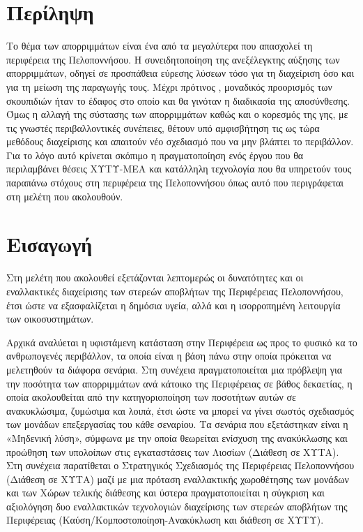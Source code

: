 \documentclass[12pt]{article}
\begin{document}
	\section*{Περίληψη}
	Το θέμα των απορριμμάτων είναι ένα από τα μεγαλύτερα που απασχολεί τη περιφέρεια της Πελοποννήσου. Η συνειδητοποίηση της ανεξέλεγκτης αύξησης των απορριμμάτων, οδηγεί σε προσπάθεια εύρεσης λύσεων τόσο για τη διαχείριση όσο και για τη μείωση της παραγωγής τους. Μέχρι πρότινος , μοναδικός προορισμός των σκουπιδιών ήταν το έδαφος στο οποίο και θα γινόταν η διαδικασία της αποσύνθεσης. Όμως η αλλαγή της σύστασης των απορριμμάτων καθώς και ο κορεσμός της γης, με τις γνωστές περιβαλλοντικές συνέπειες, θέτουν υπό αμφισβήτηση τις ως τώρα μεθόδους διαχείρισης και απαιτούν νέο σχεδιασμό που να μην βλάπτει το περιβάλλον. Για το λόγο αυτό κρίνεται σκόπιμο η πραγματοποίηση ενός έργου που θα περιλαμβάνει θέσεις ΧΥΤΥ-ΜΕΑ και κατάλληλη τεχνολογία που θα υπηρετούν τους παραπάνω στόχους στη περιφέρεια της Πελοποννήσου όπως αυτό που περιγράφεται στη μελέτη που ακολουθούν.
	\newpage
	
	\tableofcontents
	\newpage
	\listoffigures
	\newpage
	\listoftables
	\newpage
	
	
	\section{Εισαγωγή}
	Στη μελέτη που ακολουθεί εξετάζονται λεπτομερώς οι δυνατότητες και οι εναλλακτικές διαχείρισης των στερεών αποβλήτων της Περιφέρειας Πελοποννήσου, έτσι ώστε να εξασφαλίζεται η δημόσια υγεία, αλλά και η ισορροπημένη λειτουργία των οικοσυστημάτων. 
	
	Αρχικά αναλύεται η υφιστάμενη κατάσταση στην Περιφέρεια ως προς το φυσικό κα το ανθρωπογενές περιβάλλον, τα οποία είναι η βάση πάνω στην οποία πρόκειται να μελετηθούν τα διάφορα σενάρια. Στη συνέχεια πραγματοποιείται μια πρόβλεψη για την ποσότητα των απορριμμάτων ανά κάτοικο της Περιφέρειας σε βάθος δεκαετίας, η οποία ακολουθείται από την κατηγοριοποίηση των ποσοτήτων αυτών σε ανακυκλώσιμα, ζυμώσιμα και λοιπά, έτσι ώστε να μπορεί να γίνει σωστός σχεδιασμός των μονάδων επεξεργασίας του κάθε σεναρίου. Τα σενάρια που εξετάστηκαν είναι η «Μηδενική λύση», σύμφωνα με την οποία θεωρείται ενίσχυση της ανακύκλωσης και προώθηση των υπολοίπων στις εγκαταστάσεις των Λιοσίων (Διάθεση σε ΧΥΤΑ). Στη συνέχεια παρατίθεται ο Στρατηγικός Σχεδιασμός της Περιφέρειας Πελοποννήσου (Διάθεση σε ΧΥΤΑ) μαζί με μια πρόταση εναλλακτικής χωροθέτησης των μονάδων και των Χώρων τελικής διάθεσης και ύστερα πραγματοποιείται η σύγκριση και αξιολόγηση δυο εναλλακτικών τεχνολογιών διαχείρισης των στερεών αποβλήτων της Περιφέρειας (Καύση/Κομποστοποίηση-Ανακύκλωση και διάθεση σε ΧΥΤΥ). 
	
\end{document}
